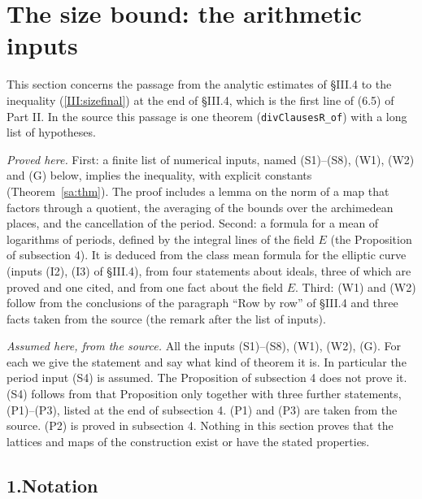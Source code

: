 \documentclass[11pt,letterpaper]{article}
\begin{document}
\section{The size bound: the arithmetic inputs}\label{sa:sec}

This section concerns the passage from the analytic estimates of \S III.4 to the inequality
(\ref{III:sizefinal}) at the end of \S III.4, which is the first line of (6.5) of Part II. In the source this
passage is one theorem (\texttt{divClausesR\_of}) with a long list of hypotheses.

\emph{Proved here.} First: a finite list of numerical inputs, named (S1)--(S8), (W1), (W2) and (G) below,
implies the inequality, with explicit constants (Theorem~\ref{sa:thm}). The proof includes a lemma on the
norm of a map that factors through a quotient, the averaging of the bounds over the archimedean places,
and the cancellation of the period. Second: a formula for a mean of logarithms of periods, defined by the
integral lines of the field $E$ (the Proposition of subsection 4). It is deduced from the class mean
formula for the elliptic curve (inputs (I2), (I3) of \S III.4), from four statements about ideals, three
of which are proved and one cited, and from one fact about the field $E$. Third: (W1) and (W2) follow from
the conclusions of the paragraph ``Row by row'' of \S III.4 and three facts taken from the source (the
remark after the list of inputs).

\emph{Assumed here, from the source.} All the inputs (S1)--(S8), (W1), (W2), (G). For each we give the
statement and say what kind of theorem it is. In particular the period input (S4) is assumed. The
Proposition of subsection 4 does not prove it. (S4) follows from that Proposition only together with
three further statements, (P1)--(P3), listed at the end of subsection 4. (P1) and (P3) are taken from
the source. (P2) is proved in subsection 4. Nothing in this section proves that the lattices and maps of the construction exist or have
the stated properties.

\subsection*{1.\quad Notation}
\end{document}

